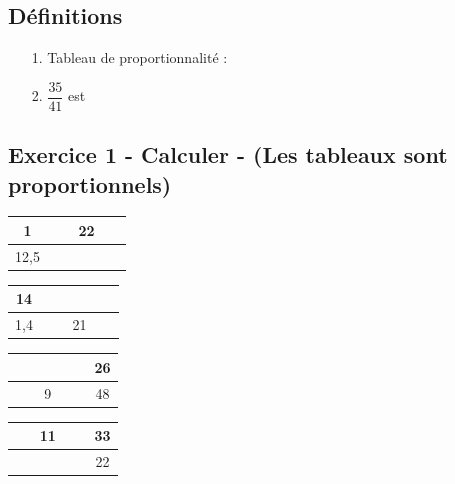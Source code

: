 \subsection*{Définitions}
  \begin{enumerate}
    \item[1.] Tableau de proportionnalité : \dotfill \\
    \Pointilles[2]
    \item[2.] $\dfrac{35}{41}$ est \dotfill \\
    \Pointilles[1]
  \end{enumerate}

\subsection*{Exercice 1 - Calculer - (Les tableaux sont proportionnels)}

\begin{multicols}{4}\noindent
  \begin{center}
    \begin{tabular}{|c|c|}
      \hline
      1 & 22\\  \hline
      12,5 & $\phantom{azertyuiop}$\\  \hline
    \end{tabular}
  \end{center}
  \Pointilles[2]
  \begin{center}
    \begin{tabular}{|c|c|}
      \hline
      14 & $\phantom{azertyuiop}$\\  \hline
      1,4 & 21\\  \hline
    \end{tabular}
  \end{center}
  \Pointilles[2]
  \begin{center}
    \begin{tabular}{|c|c|}
      \hline
      $\phantom{azertyuiop}$  & 26\\  \hline
      9 & 48\\  \hline
    \end{tabular}
  \end{center}
  \Pointilles[2]
  \begin{center}
    \begin{tabular}{|c|c|}
      \hline
      11 & 33\\  \hline
      $\phantom{azertyuiop}$ & 22\\  \hline
    \end{tabular}
  \end{center}
  \Pointilles[2]
\end{multicols}

